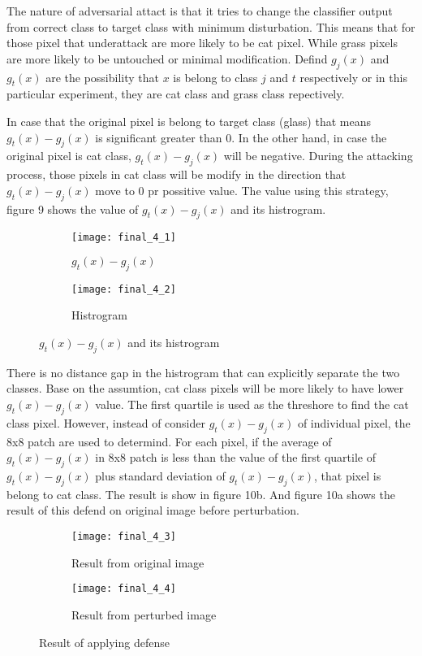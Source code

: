 \documentclass[11pt]{article}
\begin{document}
The nature of adversarial attact is that it tries to change the classifier output from correct class to target class with minimum disturbation. This means that for those pixel that underattack are more likely to be cat pixel. While grass pixels are more likely to be untouched or minimal modification. Defind $g_j(x)$ and $g_t(x)$ are the possibility that $x$ is belong to class $j$ and $t$ respectively or in this particular experiment, they are cat class and grass class repectively. 

In case that the original pixel is belong to target class (glass) that means $g_t(x) - g_j(x)$ is significant greater than 0. In the other hand, in case the original pixel is cat class,  $g_t(x) - g_j(x)$ will be negative. During the attacking process, those pixels in cat class will be modify in the direction that $g_t(x) - g_j(x)$ move to 0 pr possitive value. The value using this strategy, figure 9 shows the value of 
$g_t(x) - g_j(x)$ and its histrogram.

\begin{figure}[H]
\begin{subfigure}{.5\textwidth}
  \centering
  \texttt{[image: final\_4\_1]}
  \caption{$g_t(x) - g_j(x)$}
  \label{fig:}
\end{subfigure}
\begin{subfigure}{.5\textwidth}
  \centering
  \texttt{[image: final\_4\_2]}
  \caption{Histrogram}
  \label{fig:}
\end{subfigure}
\caption{$g_t(x) - g_j(x)$ and its histrogram}
\label{fig:}
\end{figure}

There is no distance gap in the histrogram that can explicitly separate the two classes. Base on the assumtion, cat class pixels will be more likely to have lower $g_t(x) - g_j(x)$ value. The first quartile is used as the threshore to find the cat class pixel. However, instead of consider $g_t(x) - g_j(x)$ of individual pixel, the 8x8 patch are used to determind. For each pixel, if the average of $g_t(x) - g_j(x)$ in 8x8 patch is less than the value of the first quartile of $g_t(x) - g_j(x)$ plus standard deviation of $g_t(x) - g_j(x)$, that pixel is belong to cat class. The result is show in figure 10b. And figure 10a shows the result of this defend on original image before perturbation.

\begin{figure}[H]
\begin{subfigure}{.5\textwidth}
  \centering
  \texttt{[image: final\_4\_3]}
  \caption{Result from original image}
  \label{fig:}
\end{subfigure}
\begin{subfigure}{.5\textwidth}
  \centering
  \texttt{[image: final\_4\_4]}
  \caption{Result from perturbed image}
  \label{fig:}
\end{subfigure}
\caption{Result of applying defense}
\label{fig:}
\end{figure}
\end{document}
